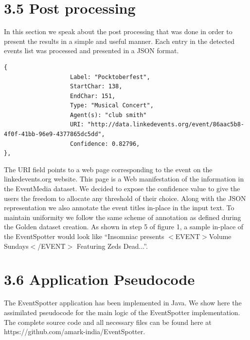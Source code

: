 \documentclass[a4paper,11pt]{report}
\begin{document}

\section*{3.5 Post processing}

In this section we speak about the post processing that was done in order to present the results in a simple and useful manner. Each entry in the detected events list was processed and presented in a JSON format. \newline


\begin{lstlisting}[caption=This listing shows the representation of a detected event in JSON format.]
{
                   Label: "Pocktoberfest",
                   StartChar: 138,
                   EndChar: 151,
                   Type: "Musical Concert",
                   Agent(s): "club smith"
                   URI: "http://data.linkedevents.org/event/86aac5b8-4f0f-41bb-96e9-4377865dc5dd",
                   Confidence: 0.82796,
},
\end{lstlisting}

The URI field points to a web page corresponding to the event on the linkedevents.org website. This page is a  Web manifestation of the information in the EventMedia dataset. We decided to expose the confidence value to give the users the freedom to allocate any threshold of their choice. Along with the JSON representation we also annotate the event titles in-place in the input text. To maintain uniformity we follow the same scheme of annotation as defined during the Golden dataset creation. As shown in step 5 of figure 1, a sample in-place of the EventSpotter would look like ``Insomniac presents $<$EVENT$>$Volume Sundays$<$/EVENT$>$ Featuring Zeds Dead...''. 

\section*{3.6 Application Pseudocode}
The EventSpotter application has been implemented in Java. We show here the assimilated pseudocode for the main logic of the EventSpotter implementation. The complete source code and all necessary files can be found here at {https://github.com/amark-india/EventSpotter}. \newline
\end{document}
